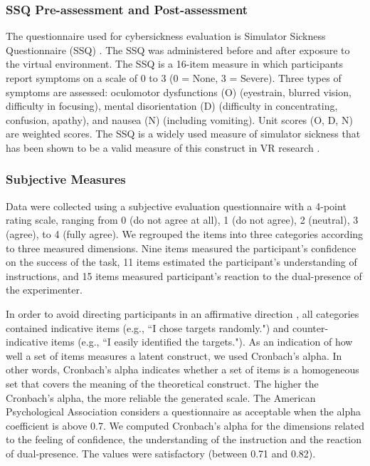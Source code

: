 \subsubsection{SSQ Pre-assessment and Post-assessment}
\label{sec:ssq_measure}
The questionnaire used for cybersickness evaluation is Simulator Sickness Questionnaire (SSQ) \citep{Kennedy1993SSQ}. The SSQ was administered before and after exposure to the virtual environment. The SSQ is a 16-item measure in which participants report symptoms on a scale of 0 to 3 (0 = None, 3 = Severe). Three types of symptoms are assessed: oculomotor dysfunctions (O) (eyestrain, blurred vision, difficulty in focusing), mental disorientation (D) (difficulty in concentrating, confusion, apathy), and nausea (N) (including vomiting). Unit scores (O, D, N) are weighted scores. The SSQ is a widely used measure of simulator sickness that has been shown to be a valid measure of this construct in VR research \citep{Cobb1999Virtual}.

\subsubsection{Subjective Measures}
Data were collected using a subjective evaluation questionnaire with a 4-point rating scale, ranging from 0 (do not agree at all), 1 (do not agree), 2 (neutral), 3 (agree), to 4 (fully agree). We regrouped the items into three categories according to three measured dimensions. Nine items measured the participant's confidence on the success of the task, 11 items estimated the participant's understanding of instructions, and 15 items measured participant's reaction to the dual-presence of the experimenter.

In order to avoid directing participants in an affirmative direction \citep{Dillman2000Mail}, all categories contained indicative items (e.g., ``I chose targets randomly.") and counter-indicative items (e.g., ``I easily identified the targets."). As an indication of how well a set of items measures a latent construct, we used Cronbach's alpha. In other words, Cronbach's alpha indicates whether a set of items is a homogeneous set that covers the meaning of the theoretical construct. The higher the Cronbach's alpha, the more reliable the generated scale. The American Psychological Association considers a questionnaire as acceptable when the alpha coefficient is above 0.7. We computed Cronbach's alpha for the dimensions related to the feeling of confidence, the understanding of the instruction and the reaction of dual-presence. The values were satisfactory (between 0.71 and 0.82).


